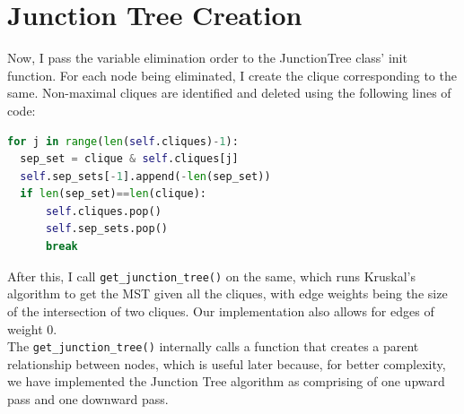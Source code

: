 \documentclass{article}
\begin{document}
\section{Junction Tree Creation}
Now, I pass the variable elimination order to the JunctionTree class' init function. For each node being eliminated, I create the clique corresponding to the same. Non-maximal cliques are identified and deleted using the following lines of code:
\begin{lstlisting}[language=Python]
  for j in range(len(self.cliques)-1):
  sep_set = clique & self.cliques[j]
  self.sep_sets[-1].append(-len(sep_set))
  if len(sep_set)==len(clique):
      self.cliques.pop()
      self.sep_sets.pop()
      break
\end{lstlisting}

After this, I call \texttt{get\_junction\_tree()} on the same, which runs Kruskal's algorithm to get the MST given all the cliques, with edge weights being the size of the intersection of two cliques. Our implementation also allows for edges of weight 0.\\
The \texttt{get\_junction\_tree()} internally calls a function that creates a parent relationship between nodes, which is useful later because, for better complexity, we have implemented the Junction Tree algorithm as comprising of one upward pass and one downward pass.\\
\end{document}
